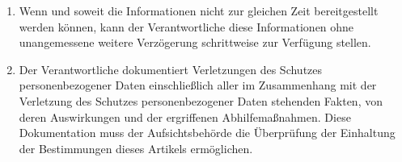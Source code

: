 \begin{enumerate}
\begin{enumerate}
  \end{enumerate}

  \item Wenn und soweit die Informationen nicht zur gleichen Zeit bereitgestellt werden können, kann der Verantwortliche
   diese Informationen ohne unangemessene weitere Verzögerung schrittweise zur Verfügung stellen.
  \label{itm:33-4}

  \item Der Verantwortliche dokumentiert Verletzungen des Schutzes personenbezogener Daten einschließlich aller im
   Zusammenhang mit der Verletzung des Schutzes personenbezogener Daten stehenden Fakten, von deren Auswirkungen und
   der ergriffenen Abhilfemaßnahmen. Diese Dokumentation muss der Aufsichtsbehörde die Überprüfung der Einhaltung der
   Bestimmungen dieses Artikels ermöglichen.
  \label{itm:33-5}

\end{enumerate}


